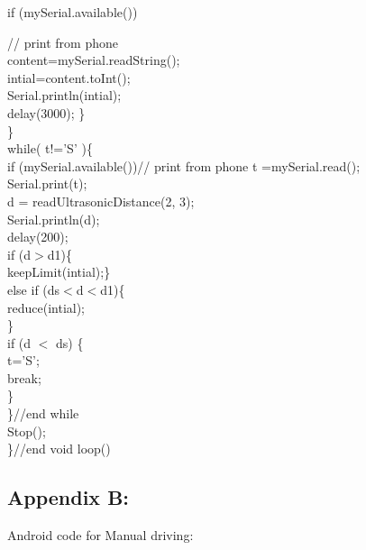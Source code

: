 \documentclass[12pt,a4paper]{report}
\begin{document}
    if (mySerial.available()){// print from phone\\
    content=mySerial.readString();\\
    intial=content.toInt(); \\
    Serial.println(intial);\\
    delay(3000); \}\\
    \}\\ 
  while( t!='S'  )\{\\
    if (mySerial.available()){// print from phone
    t =mySerial.read();\\
    Serial.print(t);}\\
    d = readUltrasonicDistance(2, 3);\\
    Serial.println(d);\\
    delay(200);\\
    if (d$>$d1)\{\\
    keepLimit(intial);\}\\
    else  if (ds$<$d$<$d1)\{\\
    reduce(intial);\\
    \} \\ 
   if (d $<$ ds) \{ \\ 
   t='S';\\
   break;\\
  \}\\
  \}//end while\\
   Stop();\\
  \}//end void loop()\\

  


\subsection*{Appendix B:}

{\large Android code for Manual driving:}\\

}
\end{document}
